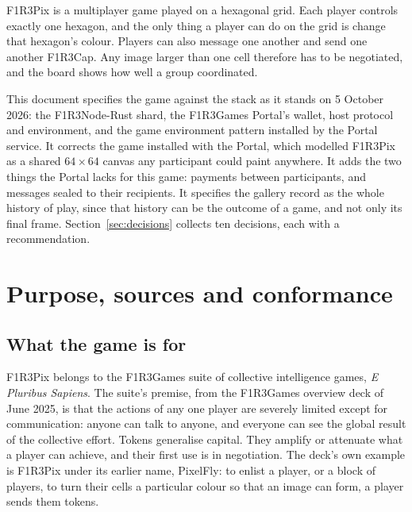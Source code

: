 \documentclass[11pt,a4paper]{article}
\newcommand{\caps}[1]{{\addfontfeatures{LetterSpace=12}\MakeUppercase{#1}}}
\begin{document}
\begin{center}
\begin{minipage}{0.9\linewidth}
{\spartanbold\fontsize{8.5}{10}\selectfont\caps{Summary}}\par\smallskip
F1R3Pix is a multiplayer game played on a hexagonal grid. Each player controls exactly one
hexagon, and the only thing a player can do on the grid is change that hexagon's colour.
Players can also message one another and send one another F1R3Cap. Any image larger than one
cell therefore has to be negotiated, and the board shows how well a group coordinated.

This document specifies the game against the stack as it stands on 5 October 2026: the
F1R3Node-Rust shard, the F1R3Games Portal's wallet, host protocol and environment, and the
game environment pattern installed by the Portal service. It corrects the game installed with
the Portal, which modelled F1R3Pix as a shared $64\times64$ canvas any participant could paint
anywhere. It adds the two things the Portal lacks for this game: payments between participants,
and messages sealed to their recipients. It specifies the gallery record as the whole history
of play, since that history can be the outcome of a game, and not only its final frame.
Section~\ref{sec:decisions} collects ten decisions, each with a recommendation.
\end{minipage}
\end{center}

\vspace{4mm}
\tableofcontents
\newpage

\section{Purpose, sources and conformance}

\subsection{What the game is for}

F1R3Pix belongs to the F1R3Games suite of collective intelligence games, \emph{E Pluribus
Sapiens}. The suite's premise, from the F1R3Games overview deck of June 2025, is that the
actions of any one player are severely limited except for communication: anyone can talk to
anyone, and everyone can see the global result of the collective effort. Tokens generalise
capital. They amplify or attenuate what a player can achieve, and their first use is in
negotiation. The deck's own example is F1R3Pix under its earlier name, PixelFly: to enlist a
player, or a block of players, to turn their cells a particular colour so that an image can
form, a player sends them tokens.
\end{document}
